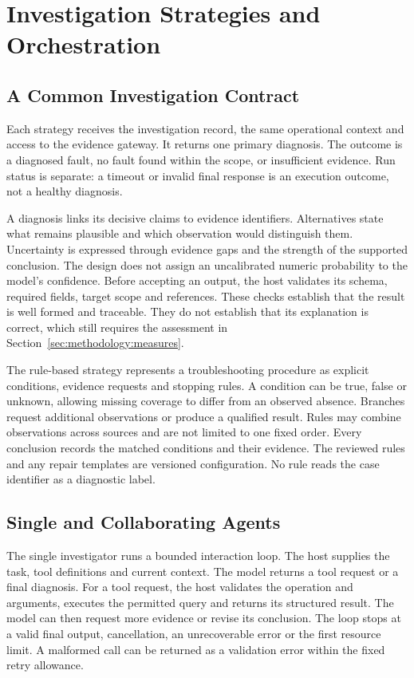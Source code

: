 \section{Investigation Strategies and Orchestration}
\label{sec:design:investigators}

\subsection{A Common Investigation Contract}

Each strategy receives the investigation record, the same operational
context and access to the evidence gateway. It returns one primary
diagnosis. The outcome is a diagnosed fault, no fault found within the
scope, or insufficient evidence. Run status is separate: a timeout or
invalid final response is an execution outcome, not a healthy diagnosis.

A diagnosis links its decisive claims to evidence identifiers. Alternatives
state what remains plausible and which observation would distinguish them.
Uncertainty is expressed through evidence gaps and the strength of the
supported conclusion. The design does not assign an uncalibrated numeric
probability to the model's confidence. Before accepting an output, the
host validates its schema, required fields, target scope and references.
These checks establish that the result is well formed and traceable.
They do not establish that its explanation is correct, which still
requires the assessment in Section~\ref{sec:methodology:measures}.

The rule-based strategy represents a troubleshooting procedure as explicit
conditions, evidence requests and stopping rules. A condition can be true,
false or unknown, allowing missing coverage to differ from an observed
absence. Branches request additional observations or produce a qualified
result. Rules may combine observations across sources and are not limited
to one fixed order. Every conclusion records the matched conditions and
their evidence. The reviewed rules and any repair templates are versioned
configuration. No rule reads the case identifier as a diagnostic label.

\subsection{Single and Collaborating Agents}

The single investigator runs a bounded interaction loop. The host supplies
the task, tool definitions and current context. The model returns a tool
request or a final diagnosis. For a tool request, the host validates the
operation and arguments, executes the permitted query and returns its
structured result. The model can then request more evidence or revise its
conclusion. The loop stops at a valid final output, cancellation, an
unrecoverable error or the first resource limit. A malformed call can be
returned as a validation error within the fixed retry allowance.

